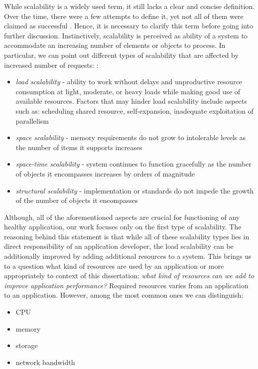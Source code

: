 While scalability is a widely used term, it still lacks a clear and concise definition. Over the time, there were a few attempts to define it, yet not all of them were claimed as successful \cite{Hi90} \cite{DuRoWi06}. Hence, it is necessary to clarify this term before going into further discussion. Instinctively, scalability is perceived as ability of a system to accommodate an increasing number of elements or objects to process. In particular, we can point out different types of scalability that are affected by increased number of requests: \cite{Bo00}:
\begin{itemize}
	\item \textit{load scalability} - ability to work without delays and unproductive resource consumption at light, moderate, or heavy loads while making good use of available resources. Factors that may hinder load scalability include aspects such as: scheduling shared resource, self-expansion, inadequate exploitation of parallelism
	\item \textit{space scalability} - memory requirements do not grow to intolerable levels as the number of items it supports increases
	\item \textit{space-time scalability} - system continues to function gracefully as the number of objects it encompasses increases by orders of magnitude
	\item \textit{structural scalability} - implementation or standards do not impede the growth of the number of objects it encompasses
\end{itemize}
Although, all of the aforementioned aspects are crucial for functioning of any healthy application, our work focuses only on the first type of scalability. The reasoning behind this statement is that while all of these scalability types lies in direct responsibility of an application developer, the load scalability can be additionally improved by adding additional resources to a system. This brings us to a question what kind of resources are used by an application or more appropriately to context of this dissertation: \textit{what kind of resources can we add to improve application performance?} Required resources varies from an application to an application. However, among the most common ones we can distinguish:
\begin{itemize}
	\item CPU
	\item memory
	\item storage
	\item network bandwidth
\end{itemize}

